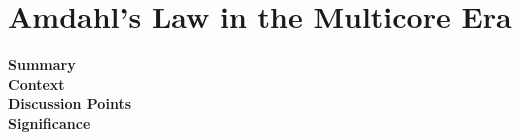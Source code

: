 \section {Amdahl’s Law in the Multicore Era \cite{hill2008amdahl}}

\begin{description}
    \item[\textbf{Summary}]
    \item[\textbf{Context}]
    \item[\textbf{Discussion Points}]
    \item[\textbf{Significance}]
\end{description}